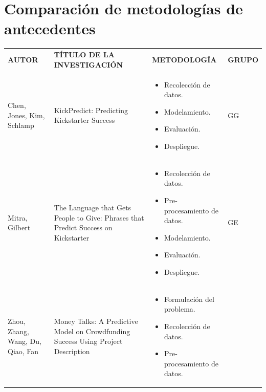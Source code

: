 	\section{Comparación de metodologías de antecedentes}
	\label{anexo4}
	\begingroup
		\renewcommand\arraystretch{0.3}
		\begin{longtable}{|M{3cm}|M{5.5cm}|M{5.5cm}|M{1.5cm}|}
			\centering
			\small
			\tabularnewline \hline
			\textbf{AUTOR} & \textbf{TÍTULO DE LA INVESTIGACIÓN} & \textbf{METODOLOGÍA} & \textbf{GRUPO}
			\\
			\hline
			Chen, Jones, Kim, Schlamp
			& KickPredict: Predicting Kickstarter Success
			& 
			\begin{itemize}[noitemsep,leftmargin=*]
				\item Recolección de datos.
				\item Modelamiento.
				\item Evaluación.
				\item Despliegue.
			\end{itemize}
			& GG
			\\
			\hline
			Mitra, Gilbert
			& The Language that Gets People to Give: Phrases that Predict Success on Kickstarter
			& 
			\begin{itemize}[noitemsep,leftmargin=*]
				\item Recolección de datos.
				\item Pre-procesamiento de datos.
				\item Modelamiento.
				\item Evaluación.
				\item Despliegue.
			\end{itemize}
			& GE
			\\
			\hline
			Zhou, Zhang, Wang, Du, Qiao, Fan
			& Money Talks: A Predictive Model on Crowdfunding Success Using Project Description
			& 
			\begin{itemize}[noitemsep,leftmargin=*]
				\item Formulación del problema.
				\item Recolección de datos.
				\item Pre-procesamiento de datos.

\end{itemize}
\end{longtable}
